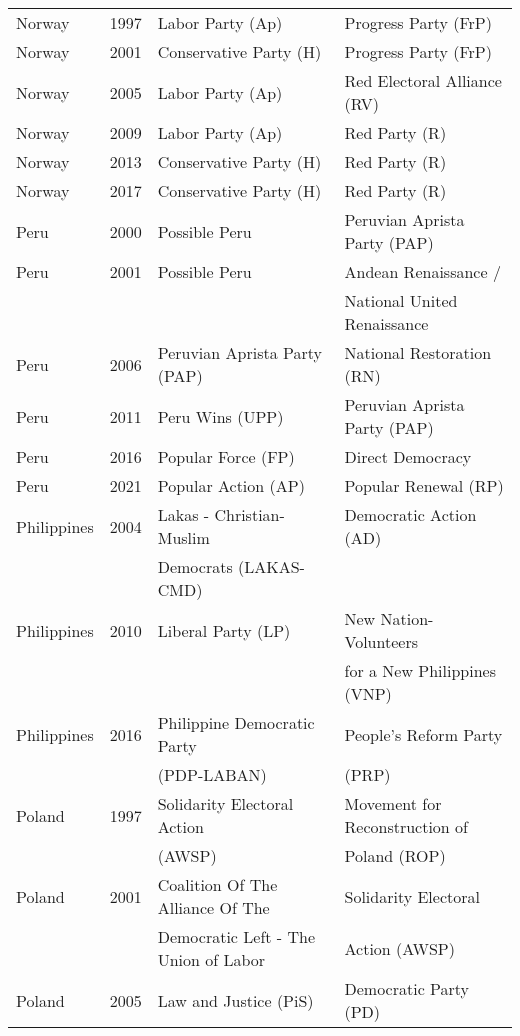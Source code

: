 {\begin{longtable}{|l|c|l|l|}
   Norway & 1997 &   Labor Party (Ap)   &   Progress Party (FrP) \\ 
   Norway & 2001 &   Conservative Party (H) &   Progress Party (FrP) \\ 
   Norway & 2005 &   Labor Party (Ap)   &   Red Electoral Alliance (RV) \\ 
   Norway & 2009 &   Labor Party (Ap)   &   Red Party (R)   \\ 
   Norway & 2013 &   Conservative Party (H) &   Red Party (R)   \\ 
   Norway & 2017 &   Conservative Party (H) &   Red Party (R)   \\ 
   Peru & 2000 &   Possible Peru   &   Peruvian Aprista Party (PAP)   \\ 
   Peru & 2001 &   Possible Peru   &   Andean Renaissance / \\ 
               &      &         &    National United Renaissance    \\ 
   Peru & 2006 &   Peruvian Aprista Party (PAP)   &   National Restoration (RN) \\ 
   Peru & 2011 &   Peru Wins (UPP)   &   Peruvian Aprista Party (PAP)   \\ 
   Peru & 2016 &   Popular Force (FP)   &   Direct Democracy \\ 
  Peru & 2021 &   Popular Action (AP) &   Popular Renewal (RP)   \\ 
  Philippines & 2004 &   Lakas - Christian-Muslim   &   Democratic Action (AD) \\ 
    &   &   Democrats (LAKAS-CMD) &   \\ 
  Philippines & 2010 &   Liberal Party (LP) &   New Nation- Volunteers  \\ 
    &   &     &    for a New Philippines (VNP) \\ 
   Philippines & 2016 &   Philippine Democratic Party  &   People's Reform Party   \\ 
    &  &     (PDP-LABAN) &    (PRP) \\ 
  Poland & 1997 &   Solidarity Electoral Action   &   Movement for Reconstruction of  \\ 
               &      &      (AWSP)    &    Poland (ROP) \\ 
  Poland & 2001 &   Coalition Of The Alliance Of The  &   Solidarity Electoral    \\ 
    &  &   Democratic   Left - The Union of  Labor &     Action (AWSP)  \\ 
  Poland & 2005 &   Law and Justice (PiS) &   Democratic Party (PD) \\ 

\end{longtable}}
